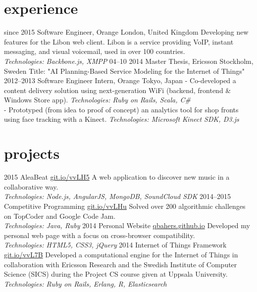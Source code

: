 \documentclass[]{friggeri-cv}
\begin{document}
\section{experience}

\begin{entrylist}
  \entry
    {since 2015}
    {Software Engineer, Orange}
    {London, United Kingdom}
    {Developing new features for the Libon web client. Libon is a service providing VoIP, instant messaging, and visual voicemail, used in over 100 countries.
    \\ \emph{Technologies: Backbone.js, XMPP}}
  \entry
    {04–10 2014}
    {Master Thesis, Ericsson}
    {Stockholm, Sweden}
    {Title: "AI Planning-Based Service Modeling for the Internet of Things"}
  \entry
    {2012–2013}
    {Software Engineer Intern, Orange}
    {Tokyo, Japan}
    {- Co-developed a content delivery solution using next-generation WiFi 
    (backend, frontend \& Windows Store app).
    \emph{Technologies: Ruby on Rails, Scala, C\#}
    \\
    - Prototyped (from idea to proof of concept) an analytics tool for shop fronts using face tracking with a Kinect. 
    \emph{Technologies: Microsoft Kinect SDK, D3.js}}
\end{entrylist}

\section{projects}

\begin{entrylist}
  \entry
    {2015}
    {AleaBeat}
    {\href{http://git.io/vvLH5}{git.io/vvLH5}}
    {A web application to discover new music in a collaborative way.
    \\ \emph{Technologies: Node.js, AngularJS, MongoDB, SoundCloud SDK}}
  \entry
    {2014–2015}
    {Competitive Programming}
    {\href{http://git.io/vvLHu}{git.io/vvLHu}}
    {Solved over 200 algorithmic challenges on TopCoder and Google Code Jam.
    \\ \emph{Technologies: Java, Ruby}}
  \entry
    {2014}
    {Personal Website}
    {\href{http://qbahers.github.io}{qbahers.github.io}}
    {Developed my personal web page with a focus on cross-browser compatibility.
    \\ \emph{Technologies: HTML5, CSS3, jQuery}}
  \entry
    {2014}
    {Internet of Things Framework}
    {\href{http://git.io/vvL7B}{git.io/vvL7B}}
    {Developed a computational engine for the Internet of Things in collaboration with Ericsson Research and 
    the Swedish Institute of Computer Science (SICS) during the Project CS course 
    given at Uppsala University. 
    \\ \emph{Technologies: Ruby on Rails, Erlang, R, Elasticsearch}}
\end{entrylist}
\end{document}
